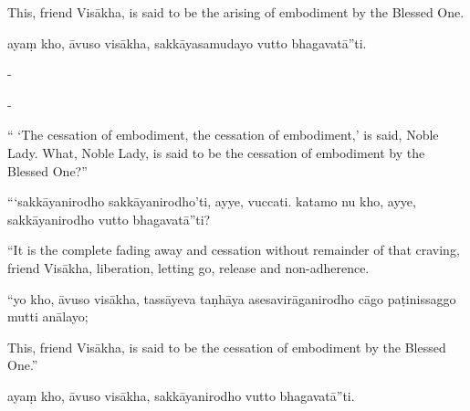 \begin{samepage}
\begin{leftcolumn*}
This, friend Visākha, is said to be the arising of embodiment by the Blessed One.
\end{leftcolumn*}

\begin{rightcolumn}
ayaṃ kho, āvuso visākha, sakkāyasamudayo vutto bhagavatā”ti.
\end{rightcolumn}
\end{samepage}

\begin{samepage}
\begin{leftcolumn*}
-
\end{leftcolumn*}

\begin{rightcolumn}
-
\end{rightcolumn}
\end{samepage}

\begin{samepage}
\begin{leftcolumn*}
“ ‘The cessation of embodiment, the cessation of embodiment,’ is said, Noble Lady. What, Noble Lady, is said to be the cessation of embodiment by the Blessed One?”
\end{leftcolumn*}

\begin{rightcolumn}
“‘sakkāyanirodho sakkāyanirodho’ti, ayye, vuccati. katamo nu kho, ayye, sakkāyanirodho vutto bhagavatā”ti?
\end{rightcolumn}
\end{samepage}

\begin{samepage}
\begin{leftcolumn*}
“It is the complete fading away and cessation without remainder of that craving, friend Visākha, liberation, letting go, release and non-adherence.
\end{leftcolumn*}

\begin{rightcolumn}
“yo kho, āvuso visākha, tassāyeva taṇhāya asesavirāganirodho cāgo paṭinissaggo mutti anālayo;
\end{rightcolumn}
\end{samepage}

\begin{samepage}
\begin{leftcolumn*}
This, friend Visākha, is said to be the cessation of embodiment by the Blessed One.”
\end{leftcolumn*}

\begin{rightcolumn}
ayaṃ kho, āvuso visākha, sakkāyanirodho vutto bhagavatā”ti.
\end{rightcolumn}
\end{samepage}

